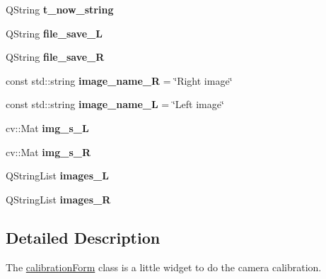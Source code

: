 \begin{DoxyCompactItemize}
\item 
\hypertarget{classcalibration_form_ae18c36e51f1c1463e7d41d27831574b8}{}Q\+String {\bfseries t\+\_\+now\+\_\+string}\label{classcalibration_form_ae18c36e51f1c1463e7d41d27831574b8}

\item 
\hypertarget{classcalibration_form_af6078e1bb25e113a7240246578da0022}{}Q\+String {\bfseries file\+\_\+save\+\_\+\+L}\label{classcalibration_form_af6078e1bb25e113a7240246578da0022}

\item 
\hypertarget{classcalibration_form_ad64208e0e84eb05552e5a84296079335}{}Q\+String {\bfseries file\+\_\+save\+\_\+\+R}\label{classcalibration_form_ad64208e0e84eb05552e5a84296079335}

\item 
\hypertarget{classcalibration_form_a78e3b5938f7be0721d8e469b70f3d23b}{}const std\+::string {\bfseries image\+\_\+name\+\_\+\+R} = \char`\"{}Right image\char`\"{}\label{classcalibration_form_a78e3b5938f7be0721d8e469b70f3d23b}

\item 
\hypertarget{classcalibration_form_aaa79b8cc38513f92d244ce1b95556992}{}const std\+::string {\bfseries image\+\_\+name\+\_\+\+L} = \char`\"{}Left image\char`\"{}\label{classcalibration_form_aaa79b8cc38513f92d244ce1b95556992}

\item 
\hypertarget{classcalibration_form_a31551e795742cf5228321c7647fa8ac6}{}cv\+::\+Mat {\bfseries img\+\_\+s\+\_\+\+L}\label{classcalibration_form_a31551e795742cf5228321c7647fa8ac6}

\item 
\hypertarget{classcalibration_form_a2ac2a809bf4a5042d5c12595bf8d4734}{}cv\+::\+Mat {\bfseries img\+\_\+s\+\_\+\+R}\label{classcalibration_form_a2ac2a809bf4a5042d5c12595bf8d4734}

\item 
\hypertarget{classcalibration_form_a259752c35c95e30153abca9e6ea28399}{}Q\+String\+List {\bfseries images\+\_\+\+L}\label{classcalibration_form_a259752c35c95e30153abca9e6ea28399}

\item 
\hypertarget{classcalibration_form_a749ceac9df13ad56870dfa7afbd907b9}{}Q\+String\+List {\bfseries images\+\_\+\+R}\label{classcalibration_form_a749ceac9df13ad56870dfa7afbd907b9}

\end{DoxyCompactItemize}


\subsection{Detailed Description}
The \hyperlink{classcalibration_form}{calibration\+Form} class is a little widget to do the camera calibration. 

